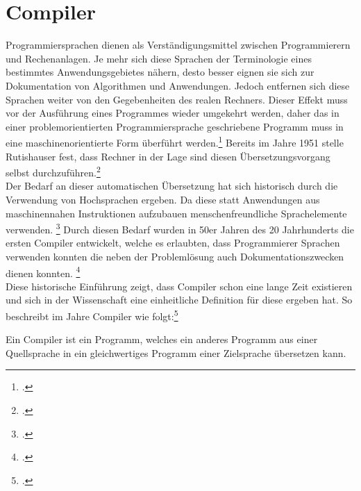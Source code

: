 \chapter{Compiler}

Programmiersprachen dienen als Verständigungsmittel zwischen Programmierern und Rechenanlagen. Je mehr sich diese Sprachen der Terminologie eines bestimmtes Anwendungsgebietes nähern, desto besser eignen sie sich zur Dokumentation von Algorithmen und Anwendungen. Jedoch entfernen sich diese Sprachen weiter von den Gegebenheiten des realen Rechners. Dieser Effekt muss vor der Ausführung eines Programmes wieder umgekehrt werden, daher das in einer problemorientierten Programmiersprache geschriebene Programm muss in eine maschinenorientierte Form überführt werden.\footcite[Vgl.][S. 15]{Schneider1975} Bereits im Jahre 1951 stelle Rutishauser fest, dass Rechner in der Lage sind diesen Übersetzungsvorgang selbst durchzuführen.\footcite[Vgl.][S. 1]{Quelle fehlt! improve https://link.springer.com/article/10.1007/BF02009622}  %
\\
Der Bedarf an dieser automatischen Übersetzung hat sich historisch durch die Verwendung von Hochsprachen ergeben. Da diese statt Anwendungen aus maschinennahen Instruktionen aufzubauen menschenfreundliche Sprachelemente verwenden. \footcite[Vgl.][S. 47]{Wagenknecht2014}
Durch diesen Bedarf wurden in 50er Jahren des 20 Jahrhunderts die ersten Compiler entwickelt, welche es erlaubten, dass Programmierer Sprachen verwenden konnten die neben der Problemlösung auch Dokumentationszwecken dienen konnten. \footcite[Vgl.][S. 1]{Quelle fehlt! Meilensteine der Rechentechnik: Zur Geschichte der Mathematik und der Informatik}  %
\\
Diese historische Einführung zeigt, dass Compiler schon eine lange Zeit existieren und sich in der Wissenschaft eine einheitliche Definition für diese ergeben hat. So beschreibt \citeauthor{Ullmann2008} im Jahre \citeyear{Ullmann2008} Compiler wie folgt:\footcite[Vgl.][S. 1]{Ullmann2008} 
\begin{Def}[Compiler]
Ein Compiler ist ein Programm, welches ein anderes Programm aus einer Quellsprache in ein gleichwertiges Programm einer Zielsprache übersetzen kann.
\end{Def}
